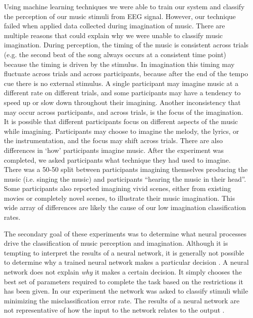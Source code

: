 Using machine learning techniques we were able to train our system and classify the perception of our music stimuli from EEG signal. 
However, our technique failed when applied data collected during imagination of music.
There are multiple reasons that could explain why we were unable to classify music imagination.
During perception, the timing of the music is consistent across trials (e.g. the second beat of the song always occurs at a consistent time point) because the timing is driven by the stimulus. 
In imagination this timing may fluctuate across trials and across participants, because after the end of the tempo cue there is no external stimulus.
A single participant may imagine music at a different rate on different trials, and some participants may have a tendency to speed up or slow down throughout their imagining. 
Another inconsistency that may occur across participants, and across trials, is the focus of the imagination. 
It is possible that different participants focus on different aspects of the music while imagining.
Participants may choose to imagine the melody, the lyrics, or the instrumentation, and the focus may shift across trials.
There are also differences in `how' participants imagine music. 
After the experiment was completed, we asked participants what technique they had used to imagine. 
There was a 50-50 split between participants imagining themselves producing the music (i.e. singing the music) and participants ``hearing the music in their head''. 
Some participants also reported imagining vivid scenes, either from existing movies or completely novel scenes, to illustrate their music imagination.
This wide array of differences are likely the cause of our low imagination classification rates. 

The secondary goal of these experiments was to determine what neural processes drive the classification of music perception and imagination.
Although it is tempting to interpret the results of a neural network, it is generally not possible to determine why a trained neural network makes a particular decision \cite{towell_1992_interpretation}.
A neural network does not explain \emph{why} it makes a certain decision.
It simply chooses the best set of parameters required to complete the task based on the restrictions it has been given.
In our experiment the network was asked to classify stimuli while minimizing the misclassification error rate. 
The results of a neural network are not representative of how the input to the network relates to the output \cite{intrator_2001_interpreting}.


